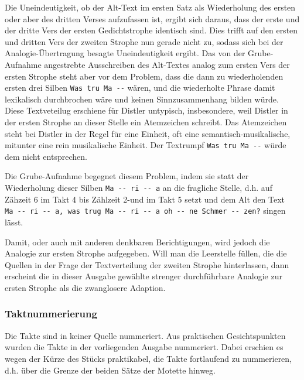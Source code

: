 \documentclass{book}
\begin{document}
\begin{multicols}{2}
Die Uneindeutigkeit, ob der Alt-Text im ersten Satz als Wiederholung des
ersten oder aber des dritten Verses aufzufassen ist, ergibt sich daraus,
dass der erste und der dritte Vers der ersten Gedichtstrophe identisch
sind. Dies trifft auf den ersten und dritten Vers der zweiten Strophe
nun gerade nicht zu, sodass sich bei der Analogie-Übertragung besagte
Uneindeutigkeit ergibt. Das von der Grube-Aufnahme angestrebte
Ausschreiben des Alt-Textes analog zum ersten Vers der ersten Strophe
steht aber vor dem Problem, dass die dann zu wiederholenden ersten drei
Silben \texttt{Was\ tru\ Ma\ -\/-} wären, und die wiederholte Phrase
damit lexikalisch durchbrochen wäre und keinen Sinnzusammenhang bilden
würde. Diese Textveteilug erschiene für Distler untypisch, insbesondere,
weil Distler in der ersten Strophe an dieser Stelle ein Atemzeichen
schreibt. Das Atemzeichen steht bei Distler in der Regel für eine
Einheit, oft eine semantisch-musikalische, mitunter eine rein
musikalische Einheit. Der Textrumpf \texttt{Was\ tru\ Ma\ -\/-} würde
dem nicht entsprechen.

Die Grube-Aufnahme begegnet diesem Problem, indem sie statt der
Wiederholung dieser Silben \texttt{Ma\ -\/-\ ri\ -\/-\ a} an die
fragliche Stelle, d.h. auf Zähzeit 6 im Takt 4 bis Zählzeit 2-und im
Takt 5 setzt und dem Alt den Text
\texttt{Ma\ -\/-\ ri\ -\/-\ a,\ was\ trug\ Ma\ -\/-\ ri\ -\/-\ a\ oh\ -\/-\ ne\ Schmer\ -\/-\ zen?}
singen lässt.

Damit, oder auch mit anderen denkbaren Berichtigungen, wird jedoch die
Analogie zur ersten Strophe aufgegeben. Will man die Leerstelle füllen,
die die Quellen in der Frage der Textverteilung der zweiten Strophe
hinterlassen, dann erscheint die in dieser Ausgabe gewählte strenger
durchführbare Analogie zur ersten Strophe als die zwanglosere Adaption.

\subsubsection{Taktnummerierung}

Die Takte sind in keiner Quelle nummeriert. Aus praktischen
Gesichtspunkten wurden die Takte in der vorliegenden Ausgabe nummeriert.
Dabei erschien es wegen der Kürze des Stücks praktikabel, die Takte
fortlaufend zu nummerieren, d.h. über die Grenze der beiden Sätze der
Motette hinweg.

\end{multicols}
\end{document}
